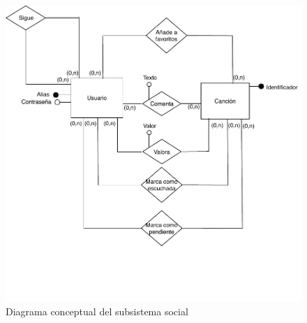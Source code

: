 \begin{figure}[H]
  \caption{Diagrama conceptual del subsistema social}
  \centering
  \includegraphics{diagramas/conceptual-social.pdf}
\end{figure}

